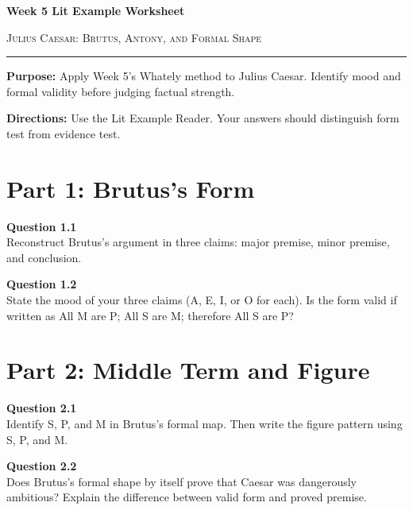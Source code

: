 \documentclass[12pt]{article}
\begin{document}
\begin{center}
{\LARGE\bfseries Week 5 Lit Example Worksheet}\par\vspace{0.05em}
{\large\scshape Julius Caesar: Brutus, Antony, and Formal Shape}\par\vspace{0.12em}
\rule{0.78\textwidth}{0.5pt}
\end{center}

\textbf{Purpose:} Apply Week 5's Whately method to Julius Caesar. Identify mood and formal validity before judging factual strength.

\textbf{Directions:} Use the Lit Example Reader. Your answers should distinguish form test from evidence test.

\section*{Part 1: Brutus's Form}

\textbf{Question 1.1}\\[-0.15em]
Reconstruct Brutus's argument in three claims: major premise, minor premise, and conclusion.


\textbf{Question 1.2}\\[-0.15em]
State the mood of your three claims (A, E, I, or O for each). Is the form valid if written as All M are P; All S are M; therefore All S are P?


\newpage

\section*{Part 2: Middle Term and Figure}

\textbf{Question 2.1}\\[-0.15em]
Identify S, P, and M in Brutus's formal map. Then write the figure pattern using S, P, and M.


\textbf{Question 2.2}\\[-0.15em]
Does Brutus's formal shape by itself prove that Caesar was dangerously ambitious? Explain the difference between valid form and proved premise.


\newpage
\end{document}
